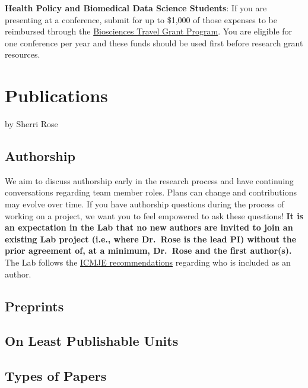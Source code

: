 \documentclass[
]{book}
\begin{document}
\textbf{Health Policy and Biomedical Data Science Students}: If you are presenting at a conference, submit for up to \$1,000 of those expenses to be reimbursed through the \href{https://oge.stanford.edu/financial/travel-grant-program/}{Biosciences Travel Grant Program}. You are eligible for one conference per year and these funds should be used first before research grant resources.

\hypertarget{publications}{%
\chapter{Publications}\label{publications}}

by Sherri Rose

\hypertarget{authorship}{%
\section{Authorship}\label{authorship}}

We aim to discuss authorship early in the research process and have continuing conversations regarding team member roles. Plans can change and contributions may evolve over time. If you have authorship questions during the process of working on a project, we want you to feel empowered to ask these questions! \textbf{It is an expectation in the Lab that no new authors are invited to join an existing Lab project (i.e., where Dr.~Rose is the lead PI) without the prior agreement of, at a minimum, Dr.~Rose and the first author(s).} The Lab follows the \href{http://www.icmje.org/recommendations/browse/roles-and-responsibilities/defining-the-role-of-authors-and-contributors.html}{ICMJE recommendations} regarding who is included as an author.

\hypertarget{preprints}{%
\section{Preprints}\label{preprints}}

\hypertarget{on-least-publishable-units}{%
\section{On Least Publishable Units}\label{on-least-publishable-units}}

\hypertarget{types-of-papers}{%
\section{Types of Papers}\label{types-of-papers}}
\end{document}
